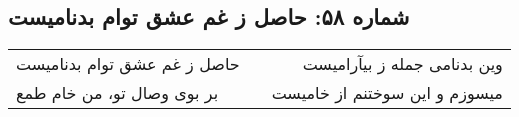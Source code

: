 \begin{center}
\section*{شماره ۵۸: حاصل ز غم عشق توام بدنامیست}
\label{sec:058}
\begin{longtable}{l p{0.5cm} r}
حاصل ز غم عشق توام بدنامیست
&&
وین بدنامی جمله ز بیآرامیست
\\
بر بوی وصال تو، من خام طمع
&&
میسوزم و این سوختنم از خامیست
\\
\end{longtable}
\end{center}
